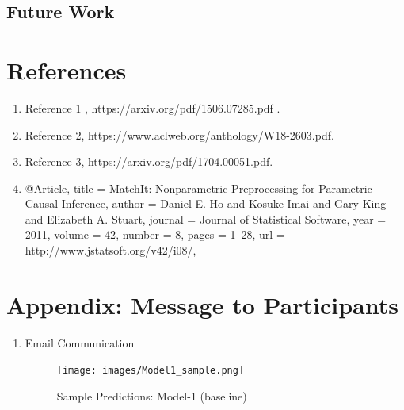 \documentclass[journal,onecolumn, 12pt]{article}
\begin{document}
\subsection{Future Work}



\clearpage
\section{References}
\vspace*{3mm}
\begin{enumerate}
  \item Reference 1 , https://arxiv.org/pdf/1506.07285.pdf .
  
  \item Reference 2, https://www.aclweb.org/anthology/W18-2603.pdf.

  \item Reference 3, https://arxiv.org/pdf/1704.00051.pdf.
  
  \item
  @Article{,
    title = {{MatchIt}: Nonparametric Preprocessing for Parametric
      Causal Inference},
    author = {Daniel E. Ho and Kosuke Imai and Gary King and Elizabeth
      A. Stuart},
    journal = {Journal of Statistical Software},
    year = {2011},
    volume = {42},
    number = {8},
    pages = {1--28},
    url = {http://www.jstatsoft.org/v42/i08/},
  }


\end{enumerate}

%
%




\clearpage
\appendix
\section{Appendix: Message to Participants }
\label{appendix:A}
\begin{enumerate}
 \item \large{Email Communication} 
\vspace*{+2mm}
\begin{figure}[h]
    \texttt{[image: images/Model1\_sample.png]}
    \caption{Sample Predictions: Model-1 (baseline)}
    \label{fig: Model1_2}
\end{figure}
\end{enumerate}
\end{document}
